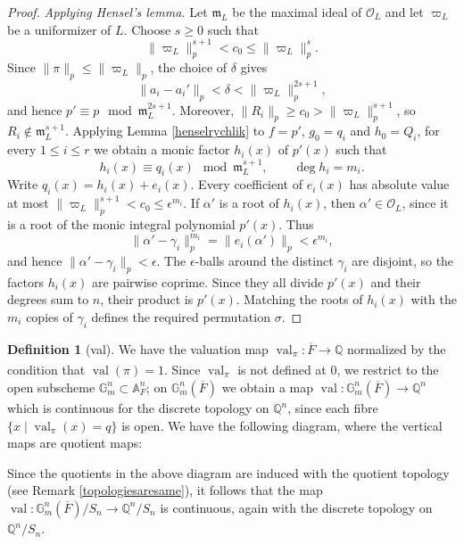 \documentclass[11pt,a4paper]{article}
\theoremstyle{definition}
\newtheorem{D}[shared]{Definition}
\theoremstyle{plain}
\theoremstyle{remark}
\theoremstyle{plain}
\DeclareMathOperator{\val}{val}
\begin{document}
\begin{proof}
    \textit{Applying Hensel's lemma.} Let $\mathfrak{m}_L$ be the maximal ideal of $\mathcal{O}_L$ and let $\varpi_L$ be a uniformizer of $L$. Choose $s\geq0$ such that
    $$\|\varpi_L\|_p^{s+1}<c_0\leq\|\varpi_L\|_p^s.$$
    Since $\|\pi\|_p\leq\|\varpi_L\|_p$, the choice of $\delta$ gives
    $$\|a_i-a_i'\|_p<\delta<\|\varpi_L\|_p^{2s+1},$$
    and hence $p'\equiv p\mod\mathfrak{m}_L^{2s+1}$. Moreover, $\|R_i\|_p\geq c_0>\|\varpi_L\|_p^{s+1}$, so $R_i\notin\mathfrak{m}_L^{s+1}$. Applying Lemma \ref{henselrychlik} to $f=p'$, $g_0=q_i$ and $h_0=Q_i$, for every $1\leq i\leq r$ we obtain a monic factor $h_i(x)$ of $p'(x)$ such that
    $$h_i(x)\equiv q_i(x)\mod\mathfrak{m}_L^{s+1},\qquad \deg h_i=m_i.$$
    Write $q_i(x)=h_i(x)+e_i(x)$. Every coefficient of $e_i(x)$ has absolute value at most $\|\varpi_L\|_p^{s+1}<c_0\leq\epsilon^{m_i}$. If $\alpha'$ is a root of $h_i(x)$, then $\alpha'\in\mathcal{O}_L$, since it is a root of the monic integral polynomial $p'(x)$. Thus
    $$\|\alpha'-\gamma_i\|_p^{m_i}=\|e_i(\alpha')\|_p<\epsilon^{m_i},$$
    and hence $\|\alpha'-\gamma_i\|_p<\epsilon$. The $\epsilon$-balls around the distinct $\gamma_i$ are disjoint, so the factors $h_i(x)$ are pairwise coprime. Since they all divide $p'(x)$ and their degrees sum to $n$, their product is $p'(x)$. Matching the roots of $h_i(x)$ with the $m_i$ copies of $\gamma_i$ defines the required permutation $\sigma$.
    \end{proof}

\begin{D}[val]
    We have the valuation map $\val_{\pi}: \overline{F} \xrightarrow[]{} \mathbb{Q}$ normalized by the condition that $\val(\pi) = 1$. Since $\val_{\pi}$ is not defined at $0$, we restrict to the open subscheme $\mathbb{G}_m^n \subset \mathbb{A}_F^n$; on $\mathbb{G}_m^n(\overline{F})$ we obtain a map $\val: \mathbb{G}_m^n(\overline{F}) \xrightarrow[]{} \mathbb{Q}^n$ which is continuous for the discrete topology on $\mathbb{Q}^n$, since each fibre $\{ x \mid \val_{\pi}(x) = q \}$ is open. We have the following diagram, where the vertical maps are quotient maps:
    \begin{center}
    \end{center}
    Since the quotients in the above diagram are induced with the quotient topology (see Remark \ref{topologiesaresame}), it follows that the map $\val: \mathbb{G}_m^n(\overline{F})/S_n \xrightarrow[]{} \mathbb{Q}^n/S_n$ is continuous, again with the discrete topology on $\mathbb{Q}^n/S_n$.
\end{D}
\end{document}
